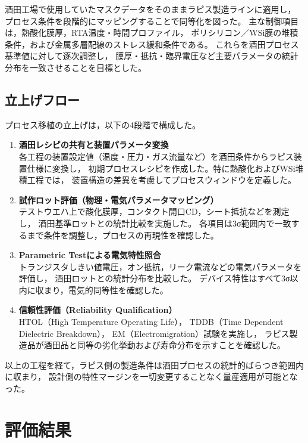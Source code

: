 \documentclass[conference]{IEEEtran}
\begin{document}
酒田工場で使用していたマスクデータをそのままラピス製造ラインに適用し，
プロセス条件を段階的にマッピングすることで同等化を図った。
主な制御項目は，熱酸化膜厚，RTA温度・時間プロファイル，
ポリシリコン／WSi膜の堆積条件，および金属多層配線のストレス緩和条件である。
これらを酒田プロセス基準値に対して逐次調整し，
膜厚・抵抗・臨界電圧など主要パラメータの統計分布を一致させることを目標とした。

\subsection{立上げフロー}
プロセス移植の立上げは，以下の4段階で構成した。

\begin{enumerate}
  \item \textbf{酒田レシピの共有と装置パラメータ変換}\\
  各工程の装置設定値（温度・圧力・ガス流量など）を酒田条件からラピス装置仕様に変換し，
  初期プロセスレシピを作成した。特に熱酸化およびWSi堆積工程では，
  装置構造の差異を考慮してプロセスウィンドウを定義した。

  \item \textbf{試作ロット評価（物理・電気パラメータマッピング）}\\
  テストウエハ上で酸化膜厚，コンタクト開口CD，シート抵抗などを測定し，
  酒田基準ロットとの統計比較を実施した。
  各項目は3σ範囲内で一致するまで条件を調整し，プロセスの再現性を確認した。

  \item \textbf{Parametric Testによる電気特性照合}\\
  トランジスタしきい値電圧，オン抵抗，リーク電流などの電気パラメータを評価し，
  酒田ロットとの統計分布を比較した。
  デバイス特性はすべて3σ以内に収まり，電気的同等性を確認した。

  \item \textbf{信頼性評価（Reliability Qualification）}\\
  HTOL（High Temperature Operating Life），
  TDDB（Time Dependent Dielectric Breakdown），
  EM（Electromigration）試験を実施し，
  ラピス製造品が酒田品と同等の劣化挙動および寿命分布を示すことを確認した。
\end{enumerate}

以上の工程を経て，ラピス側の製造条件は酒田プロセスの統計的ばらつき範囲内に収まり，
設計側の特性マージンを一切変更することなく量産適用が可能となった。

\section{評価結果}
\end{document}
